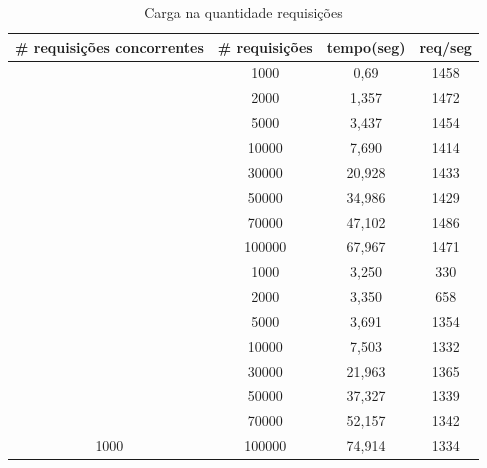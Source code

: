 \begin{table}[ht]
\centering
\begin{tabular}{|c|c|c|c|}
\hline
\rowcolor[HTML]{CFCFCF} 
\# requisições concorrentes & \# requisições & tempo(seg) & req/seg      \\ \hline
\rowcolor[HTML]{EFEFEF} 
\cellcolor[HTML]{EFEFEF} & 1000 & 0,69 & 1458  \\ \cline{2-4}
\rowcolor[HTML]{EFEFEF} 
\cellcolor[HTML]{EFEFEF} & 2000 & 1,357 & 1472  \\ \cline{2-4}
\rowcolor[HTML]{EFEFEF} 
\cellcolor[HTML]{EFEFEF} & 5000           & 3,437      & 1454  \\ \cline{2-4} 
\rowcolor[HTML]{EFEFEF} 
\cellcolor[HTML]{EFEFEF} & 10000          & 7,690      & 1414  \\ \cline{2-4} 
\rowcolor[HTML]{EFEFEF} 
\cellcolor[HTML]{EFEFEF} & 30000          & 20,928     & 1433  \\ \cline{2-4} 
\rowcolor[HTML]{EFEFEF} 
\cellcolor[HTML]{EFEFEF} & 50000          & 34,986     & 1429  \\ \cline{2-4} 
\rowcolor[HTML]{EFEFEF} 
\cellcolor[HTML]{EFEFEF} & 70000          & 47,102     & 1486  \\ \cline{2-4} 
\rowcolor[HTML]{EFEFEF}
\multirow{-8}{*}{\cellcolor[HTML]{EFEFEF}100} & 100000 & 67,967     & 1471  \\ \hline
    & 1000           & 3,250      & 330   \\ \cline{2-4} 
    & 2000           & 3,350      & 658   \\ \cline{2-4} 
    & 5000           & 3,691      & 1354  \\ \cline{2-4} 
    & 10000          & 7,503      & 1332  \\ \cline{2-4} 
    & 30000          & 21,963     & 1365  \\ \cline{2-4} 
    & 50000          & 37,327     & 1339  \\ \cline{2-4} 
    & 70000          & 52,157     & 1342  \\ \cline{2-4} 
\multirow{-8}{*}{1000}   & 100000         & 74,914     & 1334  \\ \hline    
\end{tabular}
\caption{Carga na quantidade requisições}
\label{fig: Carga na quantidade requisições}
\end{table}

